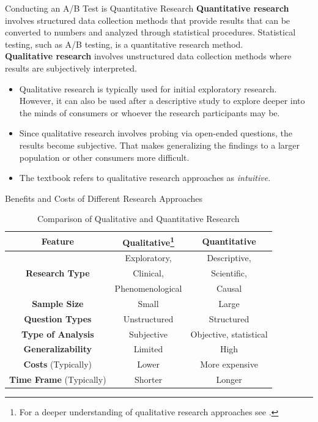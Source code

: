 \documentclass[pdf]{beamer}
\newcommand{\empr}[1]{{\color{franklinblue}\textbf{#1}}}
\theoremstyle{remark}
\theoremstyle{definition}
\begin{document}
\begin{frame}[t]{Conducting an A/B Test is Quantitative Research}
\empr{Quantitative research} involves structured data collection methods that provide results that can be converted to numbers and analyzed through statistical procedures. Statistical testing, such as A/B testing, is a quantitative research method.\\
\vspace{1.5ex}
\empr{Qualitative research} involves unstructured data collection methods where results are subjectively interpreted.\\
\vspace{0.5ex} 
\small
\begin{itemize}
\item Qualitative research is typically used for initial exploratory research.  However, it can also be used after a descriptive study to explore deeper into the minds of consumers or whoever the research participants may be. 
\item Since qualitative research involves probing via open-ended questions, the results become
subjective. That makes generalizing the findings to a larger population or other consumers more
difficult.  
\item The textbook refers to qualitative research approaches as \textit{intuitive}.
\end{itemize}
\end{frame}

\begin{frame}[t]{Benefits and Costs of Different Research Approaches}
\small
\begin{table}[htbp]
  \centering
  \captionsetup{justification=centering}
    \begin{tabular}{|ccc|}
    \toprule
   \textbf{{\color{franklinblue} Feature }} & \textbf{{\color{franklinblue} Qualitative\footnote{For a deeper understanding of qualitative research approaches see \cite{calder1977}.}}} & \textbf{{\color{franklinblue} Quantitative}}  \\
    \midrule
                           & Exploratory, & Descriptive, \\
    \textbf{Research Type} & Clinical, & Scientific, \\
                           & Phenomenological & Causal\\
    \midrule
    \textbf{Sample Size} & Small & Large \\
    \midrule
    \textbf{Question Types} & Unstructured & Structured \\    
    \midrule
    \textbf{Type of Analysis} & Subjective & Objective, statistical \\
    \midrule
    \textbf{Generalizability} & Limited & High \\
    \midrule
    \textbf{Costs} (Typically) & Lower & More expensive \\
    \midrule
    \textbf{Time Frame} (Typically) & Shorter & Longer \\
  \bottomrule
     \end{tabular}%
  \caption{Comparison of Qualitative and Quantitative Research}
  \label{tab:cqqr}%
\end{table}%
\end{frame}
\end{document}
